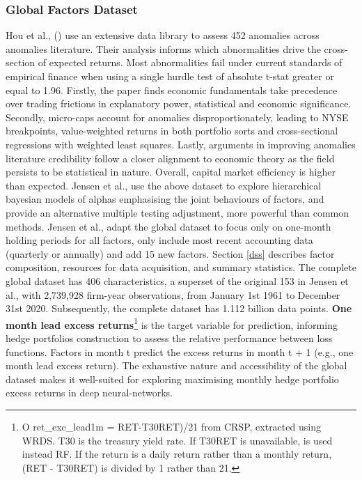 \documentclass[12pt]{article}
\begin{document}
\subsubsection*{Global Factors Dataset}
Hou et al., (\citeyear{hou2020replicating}) use an extensive data library to assess 452 anomalies across anomalies literature.
Their analysis informs which abnormalities drive the cross-section of expected returns. 
Most abnormalities fail under current standards of empirical finance when using a single hurdle test of absolute t-stat greater or equal to 1.96.
Firstly, the paper finds economic fundamentals take precedence over trading frictions in explanatory power, statistical and economic significance.
Secondly, micro-caps account for anomalies disproportionately, leading to NYSE breakpoints, value-weighted returns in both portfolio sorts and cross-sectional regressions with weighted least squares. 
Lastly, arguments in improving anomalies literature credibility follow a closer alignment to economic theory as the field persists to be statistical in nature.
Overall, capital market efficiency is higher than expected.
Jensen et al., \citeyear{jensen2021there} use the above dataset to explore hierarchical bayesian models of alphas emphasising the joint behaviours of factors, 
and provide an alternative multiple testing adjustment, more powerful than common methods.
Jensen et al., adapt the global dataset to focus only on one-month holding periods for all factors, only include most recent accounting data (quarterly or annually) and add 15 new factors.
Section \ref{dss} describes factor composition, resources for data acquisition, and summary statistics.
The complete global dataset has 406 characteristics, a superset of the original 153 in Jensen et al., with 2,739,928 firm-year observations, from January 1st 1961 to December 31st 2020.
Subsequently, the complete dataset has 1.112 billion data points. \textbf{One month lead excess returns}\footnote{O ret\_exc\_lead1m = RET-T30RET)/21 from CRSP, extracted using WRDS. T30 is the treasury yield rate. 
If T30RET is unavailable, is used instead RF. If the return is a daily return rather than a monthly return, (RET - T30RET) is divided by 1 rather than 21.} 
is the target variable for prediction, informing hedge portfolios construction to
assess the relative performance between loss functions.
Factors in month t predict the excess returns in month t + 1 (e.g., one month lead excess return). 
The exhaustive nature and accessibility of the global dataset makes it well-suited for exploring maximising monthly hedge portfolio excess returns in deep neural-networks.
\end{document}
